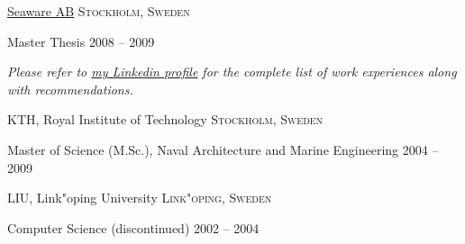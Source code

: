 \documentclass[10pt,a4paper]{article} %
\begin{document}
\headedsection %
{\href{http://www.stormgeo.com/}{Seaware AB}}
{\textsc{Stockholm, Sweden}} {

\headedsubsection %
{Master Thesis}
{2008 -- 2009}
{}
}

\begin{center}
\textit{Please refer to \href{http://www.linkedin.com/in/ciesbreijs}{my Linkedin profile} for the complete list of work experiences along with recommendations.}
\end{center}


\spacedhrule{-0.2em}{-0.4em} %



\headedsection %
{KTH, Royal Institute of Technology}
{\textsc{Stockholm, Sweden}} {

\headedsubsection %
{Master of Science (M.Sc.), Naval Architecture and Marine Engineering}
{2004 -- 2009}
{\bodytext{ }}
}


\headedsection %
{LIU, Link"oping University}
{\textsc{Link"oping, Sweden}} {

\headedsubsection %
{Computer Science \textnormal{(discontinued)}}
{2002 -- 2004} {}
}


\spacedhrule{0.5em}{-0.4em} %

\end{document}
